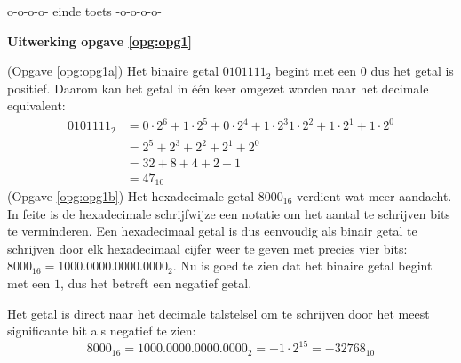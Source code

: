 \documentclass[a4paper,12pt,addpoints,fleqn,dutch]{tisdexam}
\begin{document}
\begin{questions}


\vspace{4em}
\begin{center}
o-o-o-o- einde toets -o-o-o-o-
\end{center}




\ifprintanswers
\newpage
\textbf{Uitwerking opgave \ref{opg:opg1}}

(Opgave \ref{opg:opg1a}) Het binaire getal $0101111_{2}$ begint met een $0$ dus het getal is positief.
Daarom kan het getal in \'{e}\'{e}n keer omgezet worden naar het decimale equivalent:
\begin{equation*}
\begin{split}
0101111_{2} &= 0 \cdot 2^{6} + 1 \cdot 2^{5} + 0 \cdot 2^{4} + 1 \cdot 2^{3} 1 \cdot 2^{2} + 1 \cdot 2^{1} + 1 \cdot 2^{0} \\
            &= 2^{5} + 2^{3} + 2^{2} + 2^{1} + 2^{0} \\
            &= 32 + 8 + 4 + 2 + 1 \\
            &= 47_{10}
\end{split}
\end{equation*}
(Opgave \ref{opg:opg1b}) Het hexadecimale getal $8000_{16}$ verdient wat meer aandacht. In feite is de
hexadecimale schrijfwijze een notatie om het aantal te schrijven bits te verminderen. Een hexadecimaal
getal is dus eenvoudig als binair getal te schrijven door elk hexadecimaal cijfer weer te geven met
precies vier bits: $8000_{16} = 1000.0000.0000.0000_{2}$. Nu is goed
te zien dat het binaire getal begint met een $1$, dus het betreft een negatief getal.

Het getal is direct naar het decimale talstelsel om te schrijven door het meest significante bit
als negatief te zien:
\begin{equation*}
8000_{16} = 1000.0000.0000.0000_{2} = -1 \cdot 2^{15} = -32768_{10}
\end{equation*}


\end{questions}
\end{document}
